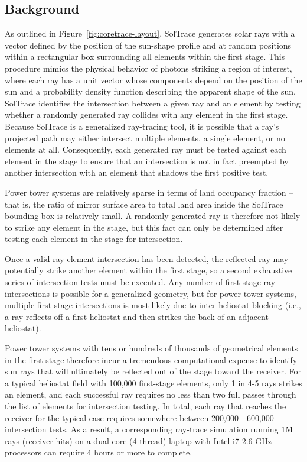 \documentclass[11pt,letterpaper]{article}
\begin{document}
\subsection{Background}
As outlined in Figure~\ref{fig:coretrace-layout}, SolTrace generates solar rays with a vector defined by the position of the sun-shape profile and at random positions within a rectangular box surrounding all elements within the first stage. 
This procedure mimics the physical behavior of photons striking a region of interest, where each ray has a unit vector whose components depend on the position of the sun and a probability density function describing the apparent shape of the sun. 
SolTrace identifies the intersection between a given ray and an element by testing whether a randomly generated ray collides with any element in the first stage. 
Because SolTrace is a generalized ray-tracing tool, it is possible that a ray's projected path may either intersect multiple elements, a single element, or no elements at all. 
Consequently, each generated ray must be tested against each element in the stage to ensure that an intersection is not in fact preempted by another intersection with an element that shadows the first positive test. 

Power tower systems are relatively sparse in terms of land occupancy fraction -- that is, the ratio of mirror surface area to total land area inside the SolTrace bounding box is relatively small. 
A randomly generated ray is therefore not likely to strike any element in the stage, but this fact can only be determined after testing each element in the stage for intersection. 

Once a valid ray-element intersection has been detected, the reflected ray may potentially strike another element within the first stage, so a second exhaustive series of intersection tests must be executed. 
Any number of first-stage ray intersections is possible for a generalized geometry, but for power tower systems, multiple first-stage intersections is most likely due to inter-heliostat blocking (i.e., a ray reflects off a first heliostat and then strikes the back of an adjacent heliostat). 

Power tower systems with tens or hundreds of thousands of geometrical elements in the first stage therefore incur a tremendous computational expense to identify sun rays that will ultimately be reflected out of the stage toward the receiver. 
For a typical heliostat field with 100,000 first-stage elements, only 1 in 4-5 rays strikes an element, and each successful ray requires no less than two full passes through the list of elements for intersection testing. 
In total, each ray that reaches the receiver for the typical case requires somewhere between 200,000 - 600,000 intersection tests. 
As a result, a corresponding ray-trace simulation running 1M rays (receiver hits) on a dual-core (4 thread) laptop with Intel i7 2.6 GHz processors can require 4 hours or more to complete. 
\end{document}
